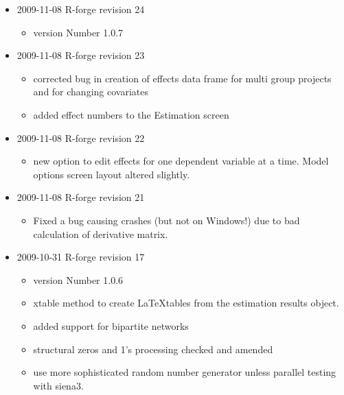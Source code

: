 \documentclass[a4paper,fleqn,11pt]{article}
\newcommand{\+}{\, + \,}
\begin{document}
\begin{small}
\begin{itemize}
\item 2009-11-08 R-forge revision 24

  \begin{itemize}
  \item
    version Number 1.0.7
  \end{itemize}
\item  2009-11-08 R-forge revision 23

  \begin{itemize}
  \item corrected bug in creation of effects data frame for multi
    group projects and for changing covariates
  \item added effect numbers to the Estimation screen
  \end{itemize}
\item 2009-11-08 R-forge revision 22
  \begin{itemize}
  \item  new option to edit effects for one dependent variable at a time. Model
    options screen layout altered slightly.
  \end{itemize}
\item 2009-11-08 R-forge revision 21
  \begin{itemize}
  \item Fixed a bug causing crashes (but not on Windows!) due to bad calculation
    of derivative matrix.
  \end{itemize}
\item 2009-10-31 R-forge revision 17
\begin{itemize}
\item version Number 1.0.6
    \item xtable method to create \LaTeX tables from the estimation results
      object.
    \item added support for bipartite networks
    \item structural zeros and 1's processing checked and amended
   \item  use more sophisticated random number generator unless parallel
     testing with siena3.
   \end{itemize}
 \end{itemize}
 \end{small}

\newpage

%

\end{document}
